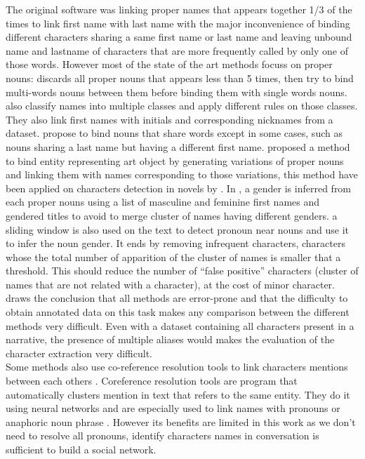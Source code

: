 \documentclass[a4paper, 12pt]{report}
\begin{document}
The original software \citep{original} was linking proper names that appears together 1/3 of the times to link first name with last name with the major inconvenience of binding different characters sharing a same first name or last name and leaving unbound name and lastname of characters that are more frequently called by only one of those words. 
However most of the state of the art methods focuss on proper nouns: \cite{delete5} discards all proper nouns that appears less than 5 times, then try to bind multi-words nouns between them before binding them with single words nouns. \cite{structure_clustering} also classify names into multiple classes and apply different rules on those classes. They also link first names with initials and corresponding nicknames from a dataset. \cite{character_meta} propose to bind nouns that share words except in some cases, such as nouns sharing a last name but having a different first name. \cite{variation} proposed a method to bind entity representing art object by generating variations of proper nouns and linking them with names corresponding to those variations, this method have been applied on characters detection in novels by \cite{quoted, character_meta}.  In \cite{delete5, structure_clustering, quoted},  a gender is inferred from each proper nouns using a list of masculine and feminine first names and gendered titles to avoid to merge cluster of names having different genders. \cite{ structure_clustering} a sliding window is also used on the text to detect pronoun near nouns and use it to infer the noun gender. It ends by removing infrequent characters, characters whose the total number of apparition of the cluster of names  is smaller that a threshold. This should reduce the number of ``false positive'' characters (cluster of names that are not related with a character), at the cost of minor character. \cite{delete5} draws the conclusion that all methods are error-prone and that the difficulty to obtain annotated data on this task makes any comparison between the different methods very difficult. Even with a dataset containing all characters present in a narrative, the presence of multiple aliases would makes the evaluation of the character extraction very difficult.  \\

Some methods also use co-reference resolution tools to link characters mentions between each others \citep{character_meta}. Coreference resolution tools are program that automatically clusters mention in text that refers to the same entity. They do it using neural networks and are especially used to link names with pronouns or anaphoric noun phrase \citep{coref_deep, coref_deep2}. However its benefits are limited in this work as we don't need to resolve all pronouns, identify characters names in conversation is sufficient to build a social network.\\
\end{document}
